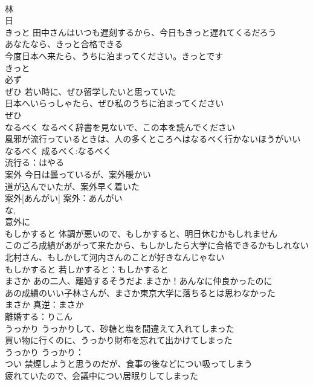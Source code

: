 \documentclass[8pt]{extreport}
\begin{document}
\begin{CJK}{UTF8}{min}
\\	林 
\\	日 
\\	きっと	田中さんはいつも遅刻するから、今日もきっと遅れてくるだろう 
\\	あなたなら、きっと合格できる 
\\	今度日本へ来たら、うちに泊まってください。きっとです 
\\	きっと			
\\	必ず 
\\	ぜひ	若い時に、ぜひ留学したいと思っていた 
\\	日本へいらっしゃたら、ぜひ私のうちに泊まってください 
\\	ぜひ						
\\	なるべく	なるべく辞書を見ないで、この本を読んでください 
\\	風邪が流行っているときは、人の多くところへはなるべく行かないほうがいい 
\\	なるべく			成るべく:なるべく
\\	流行る：はやる
\\	案外	今日は曇っているが、案外暖かい 
\\	道が込んでいたが、案外早く着いた 
\\	案外[あんがい]			案外：あんがい
\\	な, 
\\	意外に 
\\	もしかすると	体調が悪いので、もしかすると、明日休むかもしれません 
\\	このごろ成績があがって来たから、もしかしたら大学に合格できるかもしれない 
\\	北村さん、もしかして河内さんのことが好きなんじゃない 
\\	もしかすると			若しかすると：もしかすると
\\	まさか	あの二人、離婚するそうだよ.まさか！あんなに仲良かったのに 
\\	あの成績のいい子林さんが、まさか東京大学に落ちるとは思わなかった 
\\	まさか			真逆：まさか
\\	離婚する：りこん
\\	うっかり	うっかりして、砂糖と塩を間違えて入れてしまった 
\\	買い物に行くのに、うっかり財布を忘れて出かけてしまった 
\\	うっかり			うっかり：
\\	つい	禁煙しようと思うのだが、食事の後などについ吸ってしまう 
\\	疲れていたので、会議中につい居眠りしてしまった 

\end{CJK}
\end{document}
